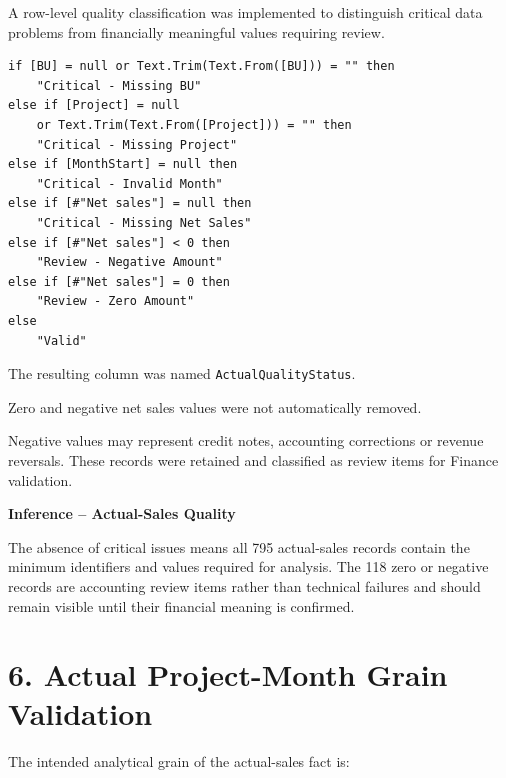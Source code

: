 \documentclass[11pt,a4paper]{article}
\begin{document}
A row-level quality classification was implemented to distinguish
critical data problems from financially meaningful values requiring
review.

\begin{lstlisting}[style=powerquery]
if [BU] = null or Text.Trim(Text.From([BU])) = "" then
    "Critical - Missing BU"
else if [Project] = null
    or Text.Trim(Text.From([Project])) = "" then
    "Critical - Missing Project"
else if [MonthStart] = null then
    "Critical - Invalid Month"
else if [#"Net sales"] = null then
    "Critical - Missing Net Sales"
else if [#"Net sales"] < 0 then
    "Review - Negative Amount"
else if [#"Net sales"] = 0 then
    "Review - Zero Amount"
else
    "Valid"
\end{lstlisting}

The resulting column was named \texttt{ActualQualityStatus}.

\begin{warningbox}

Zero and negative net sales values were not automatically removed.

Negative values may represent credit notes, accounting corrections or
revenue reversals. These records were retained and classified as review
items for Finance validation.

\end{warningbox}

\begin{inferencebox}

\textbf{Inference -- Actual-Sales Quality}

The absence of critical issues means all 795 actual-sales records contain the
minimum identifiers and values required for analysis. The 118 zero or negative
records are accounting review items rather than technical failures and should
remain visible until their financial meaning is confirmed.

\end{inferencebox}


\section{6. Actual Project-Month Grain Validation}

The intended analytical grain of the actual-sales fact is:
\end{document}
